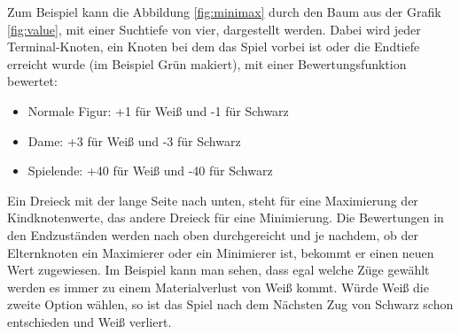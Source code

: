 \documentclass[12pt,a4paper,bibliography=totocnumbered,listof=totocnumbered]{article}
\begin{document}
Zum Beispiel kann die Abbildung \ref{fig:minimax} durch den Baum aus der Grafik \ref{fig:value}, mit einer Suchtiefe von vier, dargestellt werden.
Dabei wird jeder Terminal-Knoten, ein Knoten bei dem das Spiel vorbei ist oder die Endtiefe erreicht wurde (im Beispiel Grün makiert), 
mit einer Bewertungsfunktion bewertet:
\begin{itemize}
    \item Normale Figur: +1 für Weiß und -1 für Schwarz
    \item Dame: +3 für Weiß und -3 für Schwarz
    \item Spielende: +40 für Weiß und -40 für Schwarz
\end{itemize} 
Ein Dreieck mit der lange Seite nach unten, steht für eine Maximierung der Kindknotenwerte, das andere Dreieck für eine
Minimierung. Die Bewertungen in den Endzuständen werden nach oben durchgereicht und je nachdem, ob der Elternknoten ein Maximierer oder ein
Minimierer ist, bekommt er einen neuen Wert zugewiesen.
Im Beispiel kann man sehen, dass egal welche Züge gewählt werden es immer zu einem Materialverlust von Weiß kommt. Würde Weiß
die zweite Option wählen, so ist das Spiel nach dem Nächsten Zug von Schwarz schon entschieden und Weiß verliert. 
\end{document}
